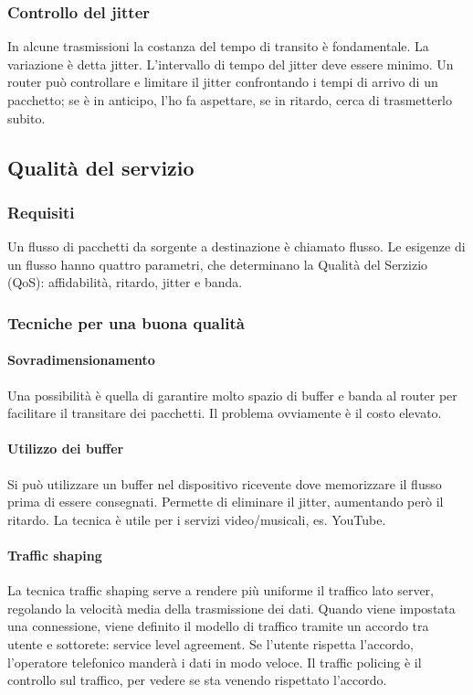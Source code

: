 \subsubsection{Controllo del jitter}
In alcune trasmissioni la costanza del tempo di transito è fondamentale.
La variazione è detta jitter.
L'intervallo di tempo del jitter deve essere minimo.
Un router può controllare e limitare il jitter confrontando i tempi di arrivo di un pacchetto;
se è in anticipo, l'ho fa aspettare, se in ritardo, cerca di trasmetterlo subito.

\subsection{Qualità del servizio} %

\subsubsection{Requisiti}
Un flusso di pacchetti da sorgente a destinazione è chiamato flusso.
Le esigenze di un flusso hanno quattro parametri, che determinano la Qualità del Serzizio (QoS): affidabilità, ritardo, jitter e banda.

\subsubsection{Tecniche per una buona qualità}

\paragraph{Sovradimensionamento}
Una possibilità è quella di garantire molto spazio di buffer e banda al router per facilitare il transitare dei pacchetti.
Il problema ovviamente è il costo elevato. 

\paragraph{Utilizzo dei buffer}
Si può utilizzare un buffer nel dispositivo ricevente dove memorizzare il flusso prima di essere consegnati.
Permette di eliminare il jitter, aumentando però il ritardo.
La tecnica è utile per i servizi video/musicali, es. YouTube.

\paragraph{Traffic shaping}
La tecnica traffic shaping serve a rendere più uniforme il traffico lato server, regolando la velocità media della trasmissione dei dati.
Quando viene impostata una connessione, viene definito il modello di traffico tramite un accordo tra utente e sottorete: service level agreement.
Se l'utente rispetta l'accordo, l'operatore telefonico manderà i dati in modo veloce.
Il traffic policing è il controllo sul traffico, per vedere se sta venendo rispettato l'accordo.

